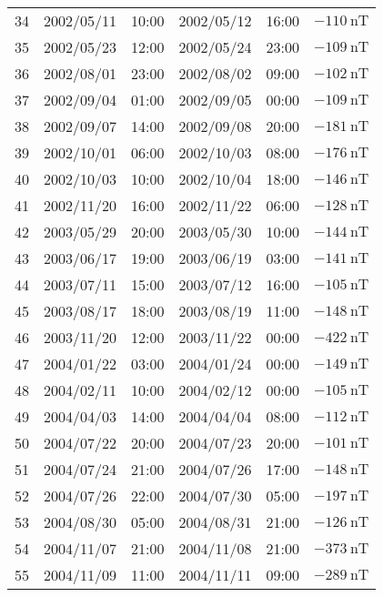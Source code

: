 \begin{table}[ht]
\begin{adjustbox}{width=\textwidth,totalheight=0.9\textheight,keepaspectratio}
\begin{tabular}{cccccc}
    34 & 2002/05/11 & 10:00 & 2002/05/12 & 16:00 & $ \SI{-110}{\nano\tesla}$ \\
    35 & 2002/05/23 & 12:00 & 2002/05/24 & 23:00 & $ \SI{-109}{\nano\tesla}$ \\
    36 & 2002/08/01 & 23:00 & 2002/08/02 & 09:00 & $ \SI{-102}{\nano\tesla}$ \\
    37 & 2002/09/04 & 01:00 & 2002/09/05 & 00:00 & $ \SI{-109}{\nano\tesla}$ \\
    38 & 2002/09/07 & 14:00 & 2002/09/08 & 20:00 & $ \SI{-181}{\nano\tesla}$ \\
    39 & 2002/10/01 & 06:00 & 2002/10/03 & 08:00 & $ \SI{-176}{\nano\tesla}$ \\
    40 & 2002/10/03 & 10:00 & 2002/10/04 & 18:00 & $ \SI{-146}{\nano\tesla}$ \\
    41 & 2002/11/20 & 16:00 & 2002/11/22 & 06:00 & $ \SI{-128}{\nano\tesla}$ \\
    42 & 2003/05/29 & 20:00 & 2003/05/30 & 10:00 & $ \SI{-144}{\nano\tesla}$ \\
    43 & 2003/06/17 & 19:00 & 2003/06/19 & 03:00 & $ \SI{-141}{\nano\tesla}$ \\
    44 & 2003/07/11 & 15:00 & 2003/07/12 & 16:00 & $ \SI{-105}{\nano\tesla}$ \\
    45 & 2003/08/17 & 18:00 & 2003/08/19 & 11:00 & $ \SI{-148}{\nano\tesla}$ \\
    46 & 2003/11/20 & 12:00 & 2003/11/22 & 00:00 & $ \SI{-422}{\nano\tesla}$ \\
    47 & 2004/01/22 & 03:00 & 2004/01/24 & 00:00 & $ \SI{-149}{\nano\tesla}$ \\
    48 & 2004/02/11 & 10:00 & 2004/02/12 & 00:00 & $ \SI{-105}{\nano\tesla}$ \\
    49 & 2004/04/03 & 14:00 & 2004/04/04 & 08:00 & $ \SI{-112}{\nano\tesla}$ \\
    50 & 2004/07/22 & 20:00 & 2004/07/23 & 20:00 & $ \SI{-101}{\nano\tesla}$ \\
    51 & 2004/07/24 & 21:00 & 2004/07/26 & 17:00 & $ \SI{-148}{\nano\tesla}$ \\
    52 & 2004/07/26 & 22:00 & 2004/07/30 & 05:00 & $ \SI{-197}{\nano\tesla}$ \\
    53 & 2004/08/30 & 05:00 & 2004/08/31 & 21:00 & $ \SI{-126}{\nano\tesla}$ \\
    54 & 2004/11/07 & 21:00 & 2004/11/08 & 21:00 & $ \SI{-373}{\nano\tesla}$ \\
    55 & 2004/11/09 & 11:00 & 2004/11/11 & 09:00 & $ \SI{-289}{\nano\tesla}$ \\

\end{tabular}
\end{adjustbox}
\end{table}
